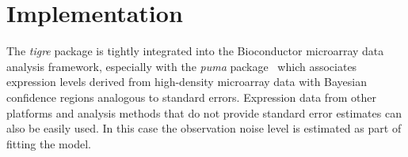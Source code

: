 \documentclass{bioinfo}
\newcommand{\tigre}{\emph{tigre}}
\begin{document}


\section{Implementation}

The \tigre{} package is tightly integrated into the Bioconductor
microarray data analysis framework, especially with the \emph{puma}
package~\citep{Pearson2009} which associates expression levels derived from
high-density microarray data with Bayesian confidence regions
analogous to standard errors.
Expression data from other platforms and analysis methods that do not
provide standard error estimates can also be easily used.  In this
case the observation noise level is estimated as part of fitting the
model.
\end{document}
